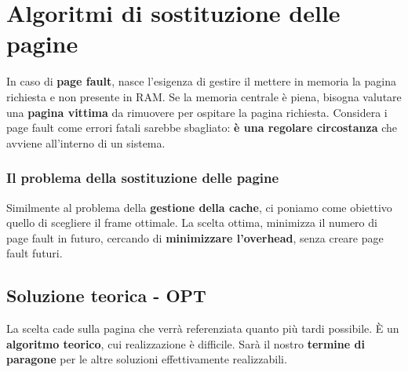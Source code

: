 \documentclass{report}
\begin{document}
\section{Algoritmi di sostituzione delle pagine}
In caso di \textbf{page fault}, nasce l'esigenza di gestire il mettere in memoria la pagina richiesta e non presente in RAM. Se la memoria centrale è piena, bisogna valutare una \textbf{pagina vittima} da rimuovere per ospitare la pagina richiesta. Considera i page fault come errori fatali sarebbe sbagliato:\textbf{ è una regolare circostanza} che avviene all'interno di un sistema.

\subsubsection{Il problema della sostituzione delle pagine}
Similmente al problema della \textbf{gestione della cache}, ci poniamo come obiettivo quello di scegliere il frame ottimale. La scelta ottima, minimizza il numero di page fault in futuro, cercando di \textbf{minimizzare l'overhead}, senza creare page fault futuri.


\subsection{Soluzione teorica - OPT}
La scelta cade sulla pagina che verrà referenziata quanto più tardi possibile. È un \textbf{algoritmo teorico}, cui realizzazione è difficile. Sarà il nostro \textbf{termine di paragone} per le altre soluzioni effettivamente realizzabili.
\end{document}
